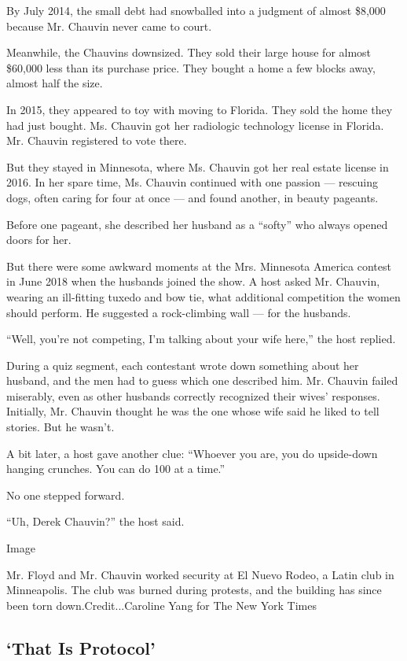 By July 2014, the small debt had snowballed into a judgment of almost
\$8,000 because Mr. Chauvin never came to court.

Meanwhile, the Chauvins downsized. They sold their large house for
almost \$60,000 less than its purchase price. They bought a home a few
blocks away, almost half the size.

In 2015, they appeared to toy with moving to Florida. They sold the home
they had just bought. Ms. Chauvin got her radiologic technology license
in Florida. Mr. Chauvin registered to vote there.

But they stayed in Minnesota, where Ms. Chauvin got her real estate
license in 2016. In her spare time, Ms. Chauvin continued with one
passion --- rescuing dogs, often caring for four at once --- and found
another, in beauty pageants.

Before one pageant, she described her husband as a ``softy'' who always
opened doors for her.

But there were some awkward moments at the Mrs. Minnesota America
contest in June 2018 when the husbands joined the show. A host asked Mr.
Chauvin, wearing an ill-fitting tuxedo and bow tie, what additional
competition the women should perform. He suggested a rock-climbing wall
--- for the husbands.

``Well, you're not competing, I'm talking about your wife here,'' the
host replied.

During a quiz segment, each contestant wrote down something about her
husband, and the men had to guess which one described him. Mr. Chauvin
failed miserably, even as other husbands correctly recognized their
wives' responses. Initially, Mr. Chauvin thought he was the one whose
wife said he liked to tell stories. But he wasn't.

A bit later, a host gave another clue: ``Whoever you are, you do
upside-down hanging crunches. You can do 100 at a time.''

No one stepped forward.

``Uh, Derek Chauvin?'' the host said.

Image

Mr. Floyd and Mr. Chauvin worked security at El Nuevo Rodeo, a Latin
club in Minneapolis. The club was burned during protests, and the
building has since been torn down.Credit...Caroline Yang for The New
York Times

\hypertarget{that-is-protocol}{%
\subsection{`That Is Protocol'}\label{that-is-protocol}}

